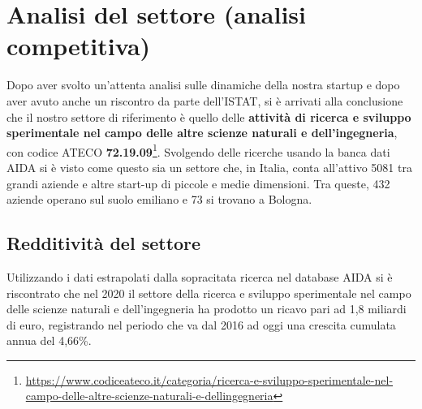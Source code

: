 

\renewcommand\tabularxcolumn[1]{m{#1}}

\newpage
\section{Analisi del settore (analisi competitiva)}

Dopo aver svolto un'attenta analisi sulle dinamiche della nostra startup e dopo aver avuto anche un riscontro da parte dell'ISTAT, si è arrivati alla conclusione che il nostro settore di riferimento è quello delle \textbf{attività di ricerca e sviluppo sperimentale nel campo delle altre scienze naturali e dell'ingegneria}, con codice ATECO \textbf{72.19.09}\footnote{\url{https://www.codiceateco.it/categoria/ricerca-e-sviluppo-sperimentale-nel-campo-delle-altre-scienze-naturali-e-dellingegneria}}. Svolgendo delle ricerche usando la banca dati AIDA si è visto come questo sia un settore che, in Italia, conta all'attivo 5081 tra grandi aziende e altre start-up di piccole e medie dimensioni. Tra queste, 432 aziende operano sul suolo emiliano e 73 si trovano a Bologna.

\subsection{Redditività del settore}

Utilizzando i dati estrapolati dalla sopracitata ricerca nel database AIDA si è riscontrato che nel 2020 il settore della ricerca e sviluppo sperimentale nel campo delle scienze naturali e dell'ingegneria ha prodotto un ricavo pari ad 1,8 miliardi di euro, registrando nel periodo che va dal 2016 ad oggi una crescita cumulata annua del 4,66\%.

